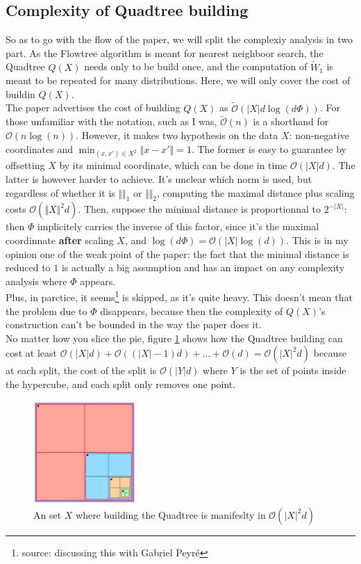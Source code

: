 \documentclass{article}
\begin{document}
\subsection{Complexity of Quadtree building}
So as to go with the flow of the paper, we will split the complexiy analysis in two part. As the Flowtree algorithm is meant for nearest neighboor search, the Quadtree $Q(X)$ needs only to be build once, and the computation of $\widetilde{W}_1$ is meant to be repeated for many distributions. Here, we will only cover the cost of buildin $Q(X)$.\\
The paper advertises the cost of building $Q(X)$ as $\widetilde{\mathcal{O}}(\vert X \vert d \log(d\Phi))$. For those unfamiliar with the notation, such as I was, $\widetilde{\mathcal{O}}(n)$ is a shorthand for $\mathcal{O}(n \log(n))$. However, it makes two hypothesis on the data $X$: non-negative coordinates and $\min_{(x, x') \in X^2} \Vert x - x' \Vert = 1$. The former is easy to guarantee by offsetting $X$ by its minimal coordinate, which can be done in time $\mathcal{O}(\vert X \vert d)$.  The latter is however harder to achieve. It's unclear which norm is used, but regardless of whether it is $\Vert \Vert_1$ or $\Vert \Vert_2$, computing the maximal distance plus scaling costs $\mathcal{O}(\Vert X \Vert^2 d)$. Then, suppose the minimal distance is proportionnal to $2^{-\vert X \vert}$: then $\Phi$ implicitely carries the inverse of this factor, since it's the maximal coordinnate \textbf{after} scaling $X$, and $\log(d\Phi) = \mathcal{O}(\vert X \vert \log(d))$. This is in my opinion one of the weak point of the paper: the fact that the minimal distance is reduced to $1$ is actually a big assumption and has an impact on any complexity analysis where $\Phi$ appears.\\
Plus, in parctice, it seems\footnote{source: discussing this with Gabriel Peyré} is skipped, as it's quite heavy. This doesn't mean that the problem due to $\Phi$ disappears, because then the complexity of $Q(X)$'s construction can't be bounded in the way the paper does it.\\
No matter how you slice the pie, figure \ref{worst_case_qb} shows how the Quadtree building can cost at least $\mathcal{O}(\vert X \vert d)+ \mathcal{O}((\vert X \vert - 1) d) + \dots + \mathcal{O}(d) = \mathcal{O}(\vert X \vert^2 d)$ because at each split, the cost of the split is $\mathcal{O}(\vert Y \vert d)$ where $Y$ is the set of points inside the hypercube, and each split only removes one point.

\begin{figure}[h]
\centering
\includegraphics[width=0.35\textwidth]{imgs/worst_case_qb.png}
\caption{An set $X$ where building the Quadtree is manifeslty in $\mathcal{O}(\vert X \vert^2 d)$}
\label{worst_case_qb}
\end{figure}
\end{document}
